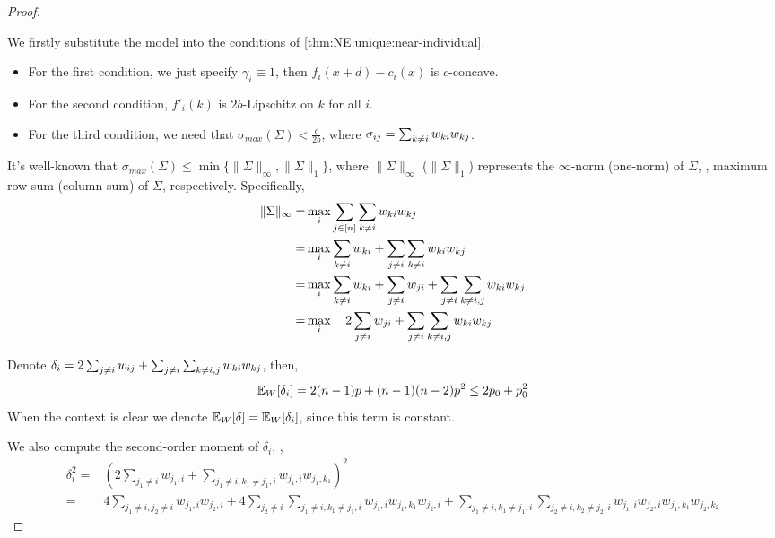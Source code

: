 \begin{proof}
\label{prf:thm:case:1}

We firstly substitute the model into the conditions of \cref{thm:NE:unique:near-individual}.
\begin{itemize}
    \item For the first condition, we just specify $\gamma_i \equiv 1$, then $f_i(x+d) - c_i(x)$ is $c$-concave.
    \item For the second condition, $f'_i(k)$ is $2b$-Lipschitz on $k$ for all $i$.
    \item For the third condition, we need that $\sigma_{max}(\Sigma) < \frac{c}{2b}$, where $\sigma_{ij} = \sum_{k\ne i} w_{ki}w_{kj}$.
\end{itemize}

It's well-known that $\sigma_{max}(\Sigma) \le \min\{ \| \Sigma \|_\infty , \| \Sigma \|_1 \}$, where $\| \Sigma \|_\infty$ ($\| \Sigma \|_1$) represents the $\infty$-norm (one-norm) of $\Sigma$, \ie, maximum row sum (column sum) of $\Sigma$, respectively. Specifically,
\begin{align*}
    \| \Sigma \|_\infty =& \max_{i} \sum_{j\in[n]} \sum_{k\ne i} w_{ki}w_{kj}
    \\
    =& \max_i \sum_{k\ne i} w_{ki} + \sum_{j\ne i} \sum_{k\ne i} w_{ki} w_{kj}
    \\
    =& \max_i \sum_{k\ne i} w_{ki} + \sum_{j\ne i} w_{ji} + \sum_{j\ne i} \sum_{k\ne i,j} w_{ki} w_{kj}
    \\
    =& \max_i \quad 2\sum_{j\ne i} w_{ji} + \sum_{j\ne i} \sum_{k\ne i,j} w_{ki} w_{kj}
\end{align*}

Denote $\delta_i = 2\sum_{j\ne i} w_{ij} + \sum_{j\ne i} \sum_{k\ne i,j} w_{ki} w_{kj}$, then,
\begin{align*}
    \mathbb{E}_W [\delta_i] = 2(n-1)p + (n-1)(n-2)p^2 \le 2p_0 + p_0^2
\end{align*}
When the context is clear we denote $\mathbb{E}_W[\delta] = \mathbb{E}_W[\delta_i]$, since this term is constant.

We also compute the second-order moment of $\delta_i$, \ie,
\begin{align*}
    \delta_i^2
    =& \left( 2\sum_{j_1\ne i} w_{j_1,i} + \sum_{j_1\ne i, k_1\ne j_1, i} w_{j_1,i} w_{j_1,k_1} \right)^2
    \\
    =& 4 \sum_{j_1\ne i, j_2\ne i} w_{j_1,i}w_{j_2,i}
    + 4 \sum_{j_2\ne i}\sum_{j_1\ne i, k_1\ne j_1,i} w_{j_1,i}w_{j_1,k_1}w_{j_2,i}
    + \sum_{j_1\ne i, k_1\ne j_1, i}\sum_{j_2\ne i, k_2\ne j_2, i} w_{j_1,i}w_{j_2,i}w_{j_1,k_1}w_{j_2,k_2}
\end{align*}


\end{proof}
